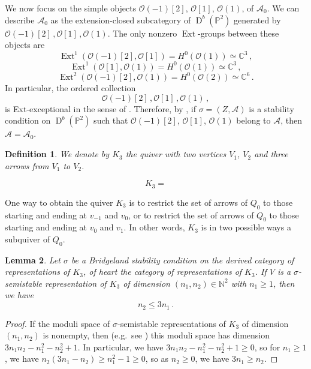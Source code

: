 \documentclass[12pt, a4paper]{amsart}
\newtheorem{defn}{Definition}[section]
\newtheorem{lem}[defn]{Lemma}
\newcommand\C{\mathbb C}
\newcommand\NN{\mathbb N}
\newcommand\PP{\mathbb P}
\newcommand\cA{\mathcal A}
\newcommand\cO{\mathcal O}
\newcommand\Ext{\operatorname{Ext}}
\newcommand\D{\operatorname{D}}
\begin{document}
We now focus on the simple objects
$\cO(-1)[2]$, $\cO[1]$, $\cO(1)$,
of $\cA_0$.
We can describe $\cA_0$ as the extension-closed
subcategory of $\D^b(\PP^2)$ generated by 
$ \cO(-1)[2]\,,\cO[1] \,, \cO(1)$.
The only nonzero
$\Ext$-groups between these objects are 
\[ \Ext^1(\cO(-1)[2],\cO[1])
=H^0(\cO(1)) \simeq \C^3 \,,\]
\[ \Ext^1(\cO[1],\cO(1))=H^0(\cO(1))
\simeq \C^3\,,\]
\[ \Ext^2(\cO(-1)[2],\cO(1))
=H^0(\cO(2)) \simeq \C^6\,.\]
In particular, the ordered collection 
\[ \cO(-1)[2]\,,\cO[1] \,, \cO(1) \,,\]
is Ext-exceptional in the sense of 
\cite[Definition 3.10]{MR2335991}.
Therefore, by \cite[Lemma 3.16]{MR2335991}, 
if $\sigma=(Z,\cA)$ is a stability condition on $\D^b(\PP^2)$ such that 
$\cO(-1)[2]$, $\cO[1]$, $\cO(1)$ belong to 
$\cA$, then $\cA=\cA_0$. 

\begin{defn}
We denote by $K_3$ the quiver with two vertices $V_1$, $V_2$ and three arrows from 
$V_1$ to $V_2$.
\end{defn}

\[K_3=\]
\begin{center}
\end{center}


One way to obtain the quiver $K_3$ is to restrict the set of arrows of $Q_0$ to those starting and ending at $v_{-1}$ and $v_0$, or to restrict the set of arrows of $Q_0$ to those starting and ending at $v_0$ and $v_1$. In other words, $K_3$ is in two possible ways a subquiver of $Q_0$.

\begin{lem}\label{lem_quiver_kronecker}
Let $\sigma$ be a Bridgeland stability condition on the derived category of representations of $K_3$, of heart the category of representations of $K_3$. If $V$ is a $\sigma$-semistable representation of $K_3$ of dimension 
$(n_1,n_2) \in \NN^2$ with $n_1 \geqslant 1$, then we have 
\[n_2 \leqslant 3n_1\,.\]
\end{lem}

\begin{proof}
If the moduli space of $\sigma$-semistable representations of $K_3$ of dimension $(n_1,n_2)$ is nonempty, then 
(e.g.\ see \cite{MR1315461}) this moduli space has dimension 
$3n_1n_2-n_1^2-n_2^2+1$. In particular, we have $3n_1 n_2-n_1^2-n_2^2+1\geqslant 0$,
so for $n_1 \geqslant 1$, we have 
$n_2(3n_1-n_2) \geqslant n_1^2-1 \geqslant 0$, so as $n_2 \geqslant 0$, we have 
$3n_1 \geqslant n_2$.
\end{proof}
\end{document}
